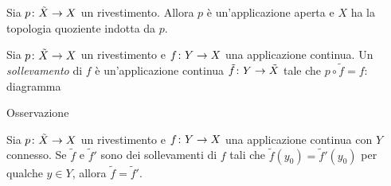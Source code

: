 \documentclass[a4paper]{article}
\begin{document}
\begin{snippetproof}{}
    \todo %
\end{snippetproof}

\begin{snippettheorem}{}
    Sia \(p \colon \tilde X \to X\)
    un rivestimento.
    Allora \(p\) è un'applicazione
    aperta e \(X\) ha la topologia quoziente indotta da \(p\).
\end{snippettheorem}

\begin{snippetproof}{}
    \todo %
\end{snippetproof}

\begin{snippetdefinition}{}
    Sia \(p \colon \tilde X \to X\)
    un rivestimento e \(f \colon Y \to X\)
    una applicazione continua. Un \emph{sollevamento}
    di \(f\) è un'applicazione
    continua \(\tilde f \colon Y \to \tilde X\) tale che \(p \circ \tilde f = f\):
    diagramma
\end{snippetdefinition}

\begin{center}
\end{center}

Osservazione %

\begin{snippettheorem}{}
    Sia \(p \colon \tilde X \to X\)
    un rivestimento e \(f \colon Y \to X\)
    una applicazione continua con \(Y\) connesso.
    Se \(\tilde f\) e \(\tilde f'\) sono dei sollevamenti
    di \(f\) tali che
    \(\tilde f(y_0) = \tilde f'(y_0)\)
    per qualche \(y \in Y\), allora \(\tilde f = \tilde f'\).
\end{snippettheorem}

\begin{snippetproof}{}
\end{snippetproof}

\begin{snippettheorem}{}
    \todo %
\end{snippettheorem}
\end{document}
